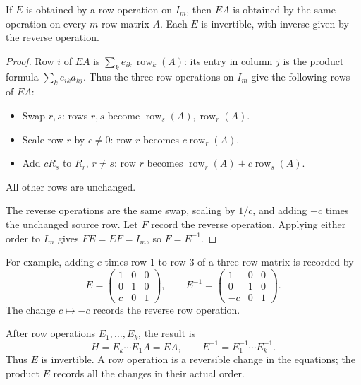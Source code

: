 \begin{proposition}\label{prop:02:elementary}
If \(E\) is obtained by a row operation on \(I_m\), then \(EA\) is obtained
by the same operation on every \(m\)-row matrix \(A\).
Each \(E\) is invertible, with inverse given by the reverse operation.
\end{proposition}
\begin{proof}
Row \(i\) of \(EA\) is \(\sum_k e_{ik}\,\operatorname{row}_k(A)\):
its entry in column \(j\) is the product formula \(\sum_k e_{ik}a_{kj}\).
Thus the three row operations on \(I_m\) give the following rows of \(EA\):
\begin{itemize}
\item Swap \(r,s\): rows \(r,s\) become
\(\operatorname{row}_s(A),\operatorname{row}_r(A)\).
\item Scale row \(r\) by \(c\ne0\): row \(r\) becomes
\(c\operatorname{row}_r(A)\).
\item Add \(cR_s\) to \(R_r\), \(r\ne s\): row \(r\) becomes
\(\operatorname{row}_r(A)+c\operatorname{row}_s(A)\).
\end{itemize}
All other rows are unchanged.

The reverse operations are the same swap, scaling by \(1/c\), and
adding \(-c\) times the unchanged source row. Let \(F\) record the
reverse operation. Applying either order to \(I_m\) gives
\(FE=EF=I_m\), so \(F=E^{-1}\).
\end{proof}
For example, adding \(c\) times row 1 to row 3 of a three-row matrix
is recorded by
\[
E=\begin{pmatrix}1&0&0\\0&1&0\\c&0&1\end{pmatrix},\qquad
E^{-1}=\begin{pmatrix}1&0&0\\0&1&0\\-c&0&1\end{pmatrix}.
\]
The change \(c\mapsto-c\) records the reverse row operation.

After row operations \(E_1,\ldots,E_k\), the result is
\[
H=E_k\cdots E_1A=EA,\qquad E^{-1}=E_1^{-1}\cdots E_k^{-1}.
\]
Thus \(E\) is invertible. A row operation is a reversible change in the
equations; the product \(E\) records all the changes in their actual order.

